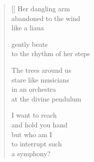 \documentclass[12pt,a4paper]{article}
\begin{document}
\thispagestyle{empty}

\poemtitle{}

\settowidth{\versewidth}{up to the fluttering measure}

\bigskip

\begin{verse}[\versewidth]
  Her dangling arm \\
  abandoned to the wind \\
  like a liana

  gently beats \\
  to the rhythm of her steps

  The trees around us \\
  stare like musicians \\
  in an orchestra \\
  at the divine pendulum

  I want to reach \\
  and hold you hand \\
  but who am I \\
  to interrupt such \\
  a symphony?
  \end{verse}
\end{document}
